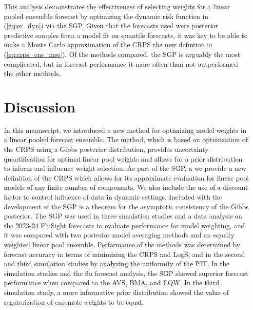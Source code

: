 % 


This analysis demonstrates the effectiveness of selecting weights for a 
linear pooled ensemble forecast by optimizing the dynamic risk function in 
(\ref{eq:er_dyn}) via the SGP. Given that the forecasts 
used were posterior predictive samples from a model fit on quantile 
forecasts, it was key to be able to make a Monte Carlo approximation of the 
CRPS the new defintion in (\ref{eq:crps_ens_mse}). 
Of the methods compared, the SGP is 
arguably the most complicated, but in forecast performance it more often than 
not outperformed the other methods. 


\section{Discussion} \label{sec:4conc}

In this manuscript, we introduced a new method for optimizing model weights 
in a linear pooled forecast ensemble. The method, which is based on 
optimization of the CRPS using a Gibbs posterior distribution, provides 
uncertainty quantification for optimal linear pool weights and allows for a 
prior distribution to inform and influence weight selection.
As part of the SGP, a we provide a new definition of the CRPS which allows
for its approximate evaluation for linear pool models of any finite number
of components. We also include the use of a discount factor to control influence
of data in dynamic settings.
Included with 
the development of the SGP is a theorem for the asymptotic consistency of 
the Gibbs posterior. The SGP was used in three simulation studies and a data 
analysis on the 2023-24 FluSight forecasts to evaluate performance for model 
weighting, and it was compared with two posterior model averaging methods 
and an equally weighted linear pool ensemble. Performance of the methods was 
determined by forecast accuracy in terms of minimizing the CRPS and LogS, 
and in the second and third simulation studies 
by analyzing the uniformity of the PIT. 
In the simulation studies and the flu forecast analysis, the SGP showed 
superior forecast 
performance when compared to the AVS, BMA, and EQW. In the third simulation 
study, a more informative prior distribution showed the value of regularization
of ensemble weights to be equal.

